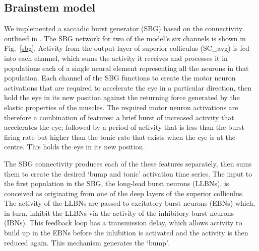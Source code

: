 \documentclass{frontiersSCNS}
\begin{document}
\subsection{Brainstem model} \label{sec:methods:brainstem}

We implemented a saccadic burst generator (SBG) based on the
connectivity outlined in \cite{gancarz_neural_1998}. The SBG network
for two of the model's six channels is shown in
Fig.~\ref{sbg}.  Activity from the output layer of superior
colliculus
%
(SC\_avg) is fed into each channel, which sums the activity it
receives and processes it in populations each of a single neural
element representing all the neurons in that population. Each channel
of the SBG functions to create the motor neuron activations that are
required to accelerate the eye in a particular direction, then hold
the eye in its new position against the returning force generated by
the elastic properties of the muscles.  The required motor neuron
activations are therefore a combination of features: a brief burst of
increased activity that accelerates the eye; followed by a period of
activity that is less than the burst firing rate but higher than the
tonic rate that exists when the eye is at the centre. This holds the
eye in its new position.

The SBG connectivity produces each of the these features separately,
then sums them to create the desired `bump and tonic' activation time
series.  The input to the first population in the SBG, the long-lead
burst neurons (LLBNs), is conceived as originating from one of the
deep layers of the superior colliculus.  The activity of the LLBNs are
passed to excitatory burst neurons (EBNs) which, in turn, inhibit the
LLBNs via the activity of the inhibitory burst neurons (IBNs).  This
feedback loop has a transmission delay, which allows activity to build
up in the EBNs before the inhibition is activated and the activity is
then reduced again.  This mechanism generates the `bump'.
\end{document}
